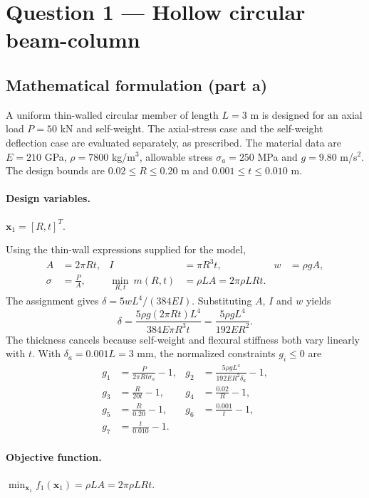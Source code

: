 \documentclass[11pt,a4paper]{article}
\begin{document}
\section{Question 1 --- Hollow circular beam-column}
\subsection{Mathematical formulation (part a)}
A uniform thin-walled circular member of length $L=3$ m is designed for an axial load $P=50$ kN and self-weight. The axial-stress case and the self-weight deflection case are evaluated separately, as prescribed. The material data are $E=210$ GPa, $\rho=7800$ kg/m$^3$, allowable stress $\sigma_a=250$ MPa and $g=9.80$ m/s$^2$. The design bounds are $0.02\le R\le0.20$ m and $0.001\le t\le0.010$ m.

\paragraph{Design variables.} $\mathbf{x}_1=[R,t]^T$.

Using the thin-wall expressions supplied for the model,
\begin{align}
 A&=2\pi Rt, & I&=\pi R^3t, & w&=\rho gA,\\
 \sigma&=\frac{P}{A}, & \min_{R,t}\ m(R,t)&=\rho LA=2\pi\rho LRt.\label{eq:q1model}
\end{align}
The assignment gives $\delta=5wL^4/(384EI)$. Substituting $A$, $I$ and $w$ yields
\begin{equation}
 \delta=\frac{5\rho g(2\pi Rt)L^4}{384E\pi R^3t}
 =\frac{5\rho gL^4}{192ER^2}.
 \label{eq:q1deflection}
\end{equation}
The thickness cancels because self-weight and flexural stiffness both vary linearly with $t$. With $\delta_a=0.001L=3$ mm, the normalized constraints $g_i\le0$ are
\begin{align}
g_1&=\frac{P}{2\pi Rt\sigma_a}-1,&
g_2&=\frac{5\rho gL^4}{192ER^2\delta_a}-1,\\
g_3&=\frac{R}{20t}-1,&g_4&=\frac{0.02}{R}-1,\\
g_5&=\frac{R}{0.20}-1,&g_6&=\frac{0.001}{t}-1,\\
g_7&=\frac{t}{0.010}-1.&&\label{eq:q1constraints}
\end{align}
\paragraph{Objective function.} $\min_{\mathbf{x}_1} f_1(\mathbf{x}_1)=\rho L A=2\pi\rho LRt$.
\end{document}
